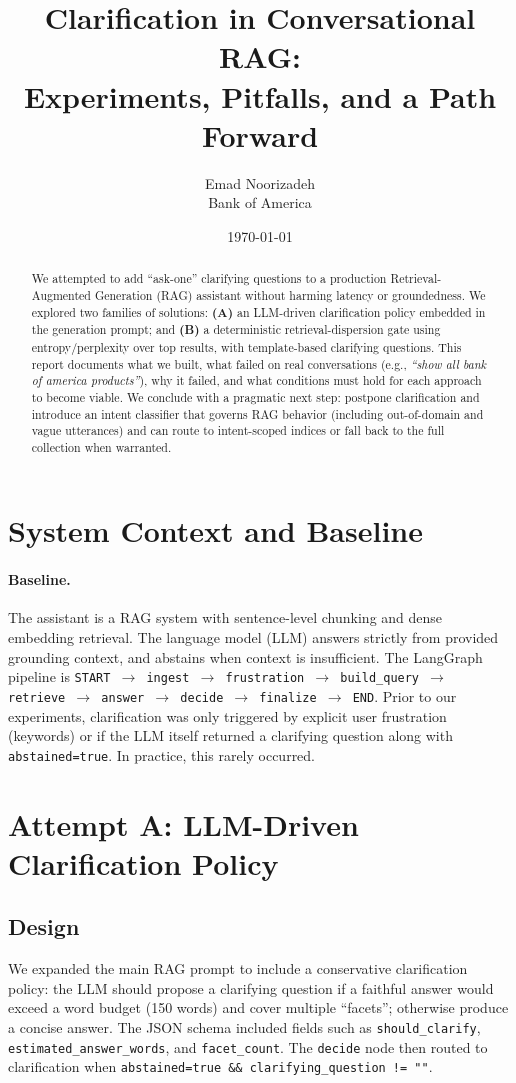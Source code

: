 \documentclass[11pt]{article}
\title{Clarification in Conversational RAG:\\Experiments, Pitfalls, and a Path Forward}
\author{Emad Noorizadeh \\ Bank of America}
\date{\today}
\begin{document}
\maketitle

\begin{abstract}
We attempted to add ``ask-one'' clarifying questions to a production Retrieval-Augmented Generation (RAG) assistant without harming latency or groundedness. We explored two families of solutions: \textbf{(A)} an LLM-driven clarification policy embedded in the generation prompt; and \textbf{(B)} a deterministic retrieval-dispersion gate using entropy/perplexity over top results, with template-based clarifying questions. This report documents what we built, what failed on real conversations (e.g., \emph{``show all bank of america products''}), why it failed, and what conditions must hold for each approach to become viable. We conclude with a pragmatic next step: postpone clarification and introduce an intent classifier that governs RAG behavior (including out-of-domain and vague utterances) and can route to intent-scoped indices or fall back to the full collection when warranted.
\end{abstract}

\section{System Context and Baseline}
\paragraph{Baseline.} The assistant is a RAG system with sentence-level chunking and dense embedding retrieval. The language model (LLM) answers strictly from provided grounding context, and abstains when context is insufficient. The LangGraph pipeline is \texttt{START $\rightarrow$ ingest $\rightarrow$ frustration $\rightarrow$ build\_query $\rightarrow$ retrieve $\rightarrow$ answer $\rightarrow$ decide $\rightarrow$ finalize $\rightarrow$ END}. Prior to our experiments, clarification was only triggered by explicit user frustration (keywords) or if the LLM itself returned a clarifying question along with \texttt{abstained=true}. In practice, this rarely occurred.

\section{Attempt A: LLM-Driven Clarification Policy}
\subsection{Design}
We expanded the main RAG prompt to include a conservative clarification policy: the LLM should propose a clarifying question if a faithful answer would exceed a word budget (150 words) and cover multiple ``facets''; otherwise produce a concise answer. The JSON schema included fields such as \texttt{should\_clarify}, \texttt{estimated\_answer\_words}, and \texttt{facet\_count}. The \texttt{decide} node then routed to clarification when \texttt{abstained=true \&\& clarifying\_question != ""}.
\end{document}
